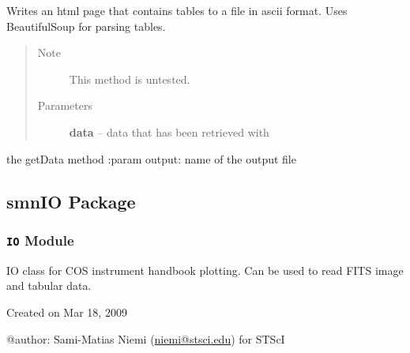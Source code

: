 \documentclass[letterpaper,10pt,english]{sphinxmanual}
\begin{document}
\begin{fulllineitems}
\begin{fulllineitems}
\end{fulllineitems}



\begin{fulllineitems}
\label{SamPy.smakced:SamPy.smakced.getSmackedDataNoNumpy.Smakced.writeToFile}
Writes an html page that contains tables to a file
in ascii format.
Uses BeautifulSoup for parsing tables.
\begin{quote}\begin{description}
\item[{Note }] \leavevmode
This method is untested.

\item[{Parameters}] \leavevmode
\textbf{data} -- data that has been retrieved with

\end{description}\end{quote}

the getData method
:param output: name of the output file

\end{fulllineitems}


\end{fulllineitems}



\subsection{smnIO Package}
\label{SamPy.smnIO:smnio-package}\label{SamPy.smnIO::doc}

\subsubsection{\texttt{IO} Module}
\label{SamPy.smnIO:module-SamPy.smnIO.IO}\label{SamPy.smnIO:io-module}
IO class for COS instrument handbook plotting.
Can be used to read FITS image and tabular data.

Created on Mar 18, 2009

@author: Sami-Matias Niemi (\href{mailto:niemi@stsci.edu}{niemi@stsci.edu}) for STScI

\end{document}
